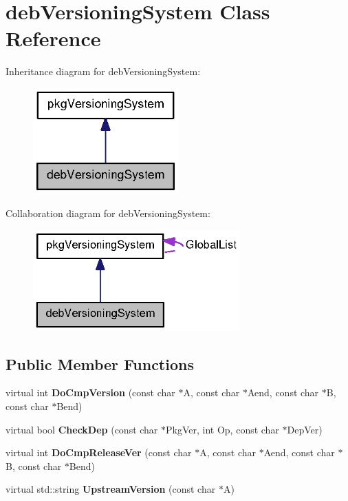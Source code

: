 \section{deb\-Versioning\-System \-Class \-Reference}
\label{classdebVersioningSystem}


\-Inheritance diagram for deb\-Versioning\-System\-:
\nopagebreak
\begin{figure}[H]
\begin{center}
\leavevmode
\includegraphics[width=158pt]{classdebVersioningSystem__inherit__graph}
\end{center}
\end{figure}


\-Collaboration diagram for deb\-Versioning\-System\-:
\nopagebreak
\begin{figure}[H]
\begin{center}
\leavevmode
\includegraphics[width=225pt]{classdebVersioningSystem__coll__graph}
\end{center}
\end{figure}
\subsection*{\-Public \-Member \-Functions}
\begin{DoxyCompactItemize}
\item 
virtual int {\bfseries \-Do\-Cmp\-Version} (const char $\ast$\-A, const char $\ast$\-Aend, const char $\ast$\-B, const char $\ast$\-Bend)\label{classdebVersioningSystem_a4835c42aa39edecc6c7f33661ab3c0a0}

\item 
virtual bool {\bfseries \-Check\-Dep} (const char $\ast$\-Pkg\-Ver, int \-Op, const char $\ast$\-Dep\-Ver)\label{classdebVersioningSystem_ab99b98bb3a3b487e7c9631b0dac41959}

\item 
virtual int {\bfseries \-Do\-Cmp\-Release\-Ver} (const char $\ast$\-A, const char $\ast$\-Aend, const char $\ast$\-B, const char $\ast$\-Bend)\label{classdebVersioningSystem_aa5fddda9778b2bab4c1dba9272880626}

\item 
virtual std\-::string {\bfseries \-Upstream\-Version} (const char $\ast$\-A)\label{classdebVersioningSystem_a1f393e8c988f21bf2b8849409b52f083}

\end{DoxyCompactItemize}
